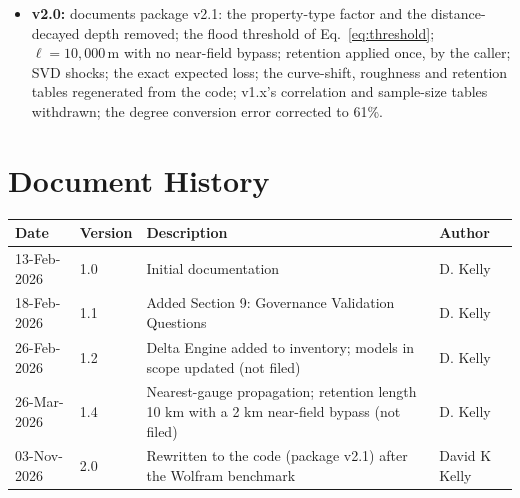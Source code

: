 \documentclass[11pt,a4paper]{article}
\renewcommand{\mkmhistorypage}[1]{%
    \section{Document History}
    \begin{table}[ht]
        \centering
        \begin{tabular}{l|l|p{9cm}|l}
            \textbf{Date} & \textbf{Version} & \textbf{Description} & \textbf{Author} \\
            \hline
            #1
        \end{tabular}
    \end{table}
}
\begin{document}
\mkmchangelog

\begin{itemize}[nosep]
    \item \textbf{v2.0:} documents package v2.1: the property-type factor and the
          distance-decayed depth removed; the flood threshold of
          Eq.~\eqref{eq:threshold}; $\ell=10{,}000$\,m with no near-field bypass;
          retention applied once, by the caller; SVD shocks; the exact expected loss;
          the curve-shift, roughness and retention tables regenerated from the code;
          v1.x's correlation and sample-size tables withdrawn; the degree conversion
          error corrected to 61\%.
\end{itemize}

\mkmhistorypage{13-Feb-2026 & 1.0 & Initial documentation & D. Kelly \\
18-Feb-2026 & 1.1 & Added Section 9: Governance Validation Questions & D. Kelly \\
26-Feb-2026 & 1.2 & Delta Engine added to inventory; models in scope updated (not filed) & D. Kelly \\
26-Mar-2026 & 1.4 & Nearest-gauge propagation; retention length 10 km with a 2 km near-field bypass (not filed) & D. Kelly \\
03-Nov-2026 & 2.0 & Rewritten to the code (package v2.1) after the Wolfram benchmark & David K Kelly \\}
\end{document}
